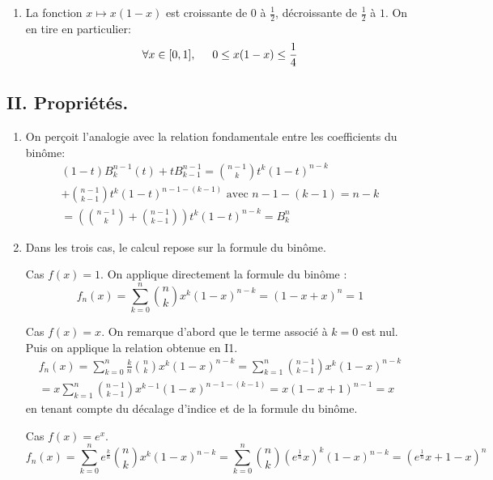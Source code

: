 \begin{enumerate}
\item La fonction $x\mapsto x(1-x)$ est croissante de $0$ à $\frac{1}{2}$, décroissante de $\frac{1}{2}$ à $1$. On en tire en particulier:
\begin{displaymath}
 \forall x\in [0,1],\hspace{0.5cm} 0\leq x(1-x) \leq \frac{1}{4}
\end{displaymath}

\end{enumerate}

\subsection*{II. Propriétés.}
\begin{enumerate}
 \item On perçoit l'analogie avec la relation fondamentale entre les coefficients du binôme:
\begin{multline*}
 (1-t)B^{n-1}_k(t)+tB^{n-1}_{k-1}=
\binom{n-1}{k}t^k(1-t)^{n-k}\\
 + \binom{n-1}{k-1}t^k(1-t)^{n-1-(k-1)}\text{ avec } n-1-(k-1)=n-k\\
=\left(\binom{n-1}{k} + \binom{n-1}{k-1} \right)t^k(1-t)^{n-k}
= B^n_k 
\end{multline*}

\item Dans les trois cas, le calcul repose sur la formule du binôme.

Cas $f(x)=1$. On applique directement la formule du bin{\^o}me :
\begin{displaymath}
f_{n}(x)=\sum_{k=0}^{n}\binom{n}{k}x^{k}(1-x)^{n-k}=(1-x+x)^n=1 
\end{displaymath}

Cas $f(x)=x$. On remarque d'abord que le terme associ{\'e} {\`a} $k=0$ est nul. Puis on applique la relation obtenue en I1.
\begin{multline*}
f_{n}(x)=\sum_{k=0}^{n}\frac{k}{n}\binom{n}{k}x^{k}(1-x)^{n-k}
= \sum_{k=1}^{n}\binom{n-1}{k-1}x^{k}(1-x)^{n-k} \\
=x\sum_{k=1}^{n}\binom{n-1}{k-1}x^{k-1}(1-x)^{n-1-(k-1)}
= x(1-x+1)^{n-1}=x 
\end{multline*}
en tenant compte du d{\'e}calage d'indice et de la formule du bin{\^o}me.

Cas $f(x)=e^{x}$.
\begin{displaymath}
f_{n}(x)  =  \sum_{k=0}^{n}e^{\frac{k}{n}}\binom{n}{k}x^{k}(1-x)^{n-k}
=\sum_{k=0}^{n}\binom{n}{k}(e^{\frac{1}{n}}x)^{k}(1-x)^{n-k}
 = \left( e^{\frac{1}{n}}x+1-x\right) ^{n}
\end{displaymath}


\end{enumerate}
